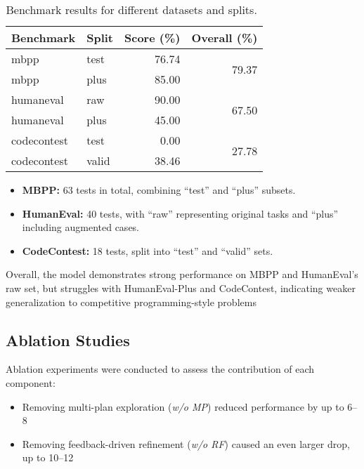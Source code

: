 \documentclass[11pt,a4paper]{article}
\begin{document}
\begin{table}[h]
\centering
\begin{tabular}{l l r r}
  \toprule
  \textbf{Benchmark} & \textbf{Split} & \textbf{Score (\%)} & \textbf{Overall (\%)} \\
  \midrule
  mbpp        & test  & 76.74 & \multirow{2}{*}{79.37} \\
  mbpp        & plus  & 85.00 & \\
  \midrule
  humaneval   & raw   & 90.00 & \multirow{2}{*}{67.50} \\
  humaneval   & plus  & 45.00 & \\
  \midrule
  codecontest & test  &  0.00 & \multirow{2}{*}{27.78} \\
  codecontest & valid & 38.46 & \\
  \bottomrule
\end{tabular}
\caption{Benchmark results for different datasets and splits.~\cite{a-pair-coder}}
\label{tab:benchmark_results}
\end{table}

\begin{itemize}
  \item \textbf{MBPP:} 63 tests in total, combining “test” and “plus” subsets.
  \item \textbf{HumanEval:} 40 tests, with “raw” representing original tasks and “plus” including augmented cases.
  \item \textbf{CodeContest:} 18 tests, split into “test” and “valid” sets.
\end{itemize}

\noindent
Overall, the model demonstrates strong performance on MBPP and HumanEval’s raw set, but 
struggles with HumanEval-Plus and CodeContest, indicating weaker generalization to 
competitive programming-style problems

\subsection{Ablation Studies}
Ablation experiments were conducted to assess the contribution of each component:
\begin{itemize}
\item Removing multi-plan exploration (\textit{w/o MP}) reduced performance by up to 6–8%
\item Removing feedback-driven refinement (\textit{w/o RF}) caused an even larger drop, up to 10–12%
\end{itemize}
\end{document}
